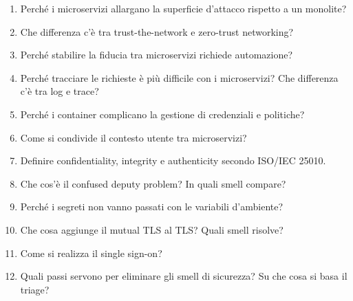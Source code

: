 \begin{domande}
\begin{enumerate}
  \item Perché i microservizi allargano la superficie d'attacco rispetto a un monolite?
  \item Che differenza c'è tra trust-the-network e zero-trust networking?
  \item Perché stabilire la fiducia tra microservizi richiede automazione?
  \item Perché tracciare le richieste è più difficile con i microservizi? Che differenza c'è tra log e trace?
  \item Perché i container complicano la gestione di credenziali e politiche?
  \item Come si condivide il contesto utente tra microservizi?
  \item Definire confidentiality, integrity e authenticity secondo ISO/IEC 25010.
  \item Che cos'è il confused deputy problem? In quali smell compare?
  \item Perché i segreti non vanno passati con le variabili d'ambiente?
  \item Che cosa aggiunge il mutual TLS al TLS? Quali smell risolve?
  \item Come si realizza il single sign-on?
  \item Quali passi servono per eliminare gli smell di sicurezza? Su che cosa si basa il triage?
\end{enumerate}
\end{domande}
